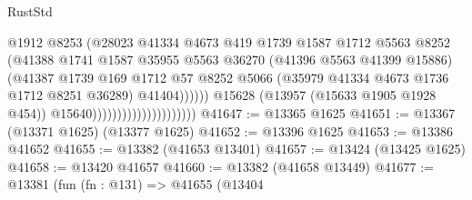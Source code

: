 \begin{lexlean}{RustStd}
\begin{coremodule}
                                                    @1912
                                                    @8253
                                                    (@28023
                                                      @41334
                                                      @4673
                                                      @419
                                                      @1739
                                                      @1587
                                                      @1712
                                                      @5563
                                                      @8252
                                                      (@41388
                                                        @1741
                                                        @1587
                                                        @35955
                                                        @5563
                                                        @36270
                                                        (@41396 @5563 @41399 @15886)
                                                        (@41387
                                                          @1739
                                                          @169
                                                          @1712
                                                          @57
                                                          @8252
                                                          @5066
                                                          (@35979
                                                            @41334
                                                            @4673
                                                            @1736
                                                            @1712
                                                            @8251
                                                            @36289)
                                                          @41404))))))
                                              @15628
                                              (@13957 (@15633 @1905 @1928 @454))
                                              @15640)))))))))))))))))))))
@41647 := @13365 @1625
@41651 := @13367 (@13371 @1625) (@13377 @1625)
@41652 := @13396 @1625
@41653 := @13386 @41652
@41655 := @13382 (@41653 @13401)
@41657 := @13424 (@13425 @1625)
@41658 := @13420 @41657
@41660 := @13382 (@41658 @13449)
@41677 := @13381
    (fun (fn : @131) =>
    @41655
      (@13404

\end{coremodule}
\end{lexlean}
